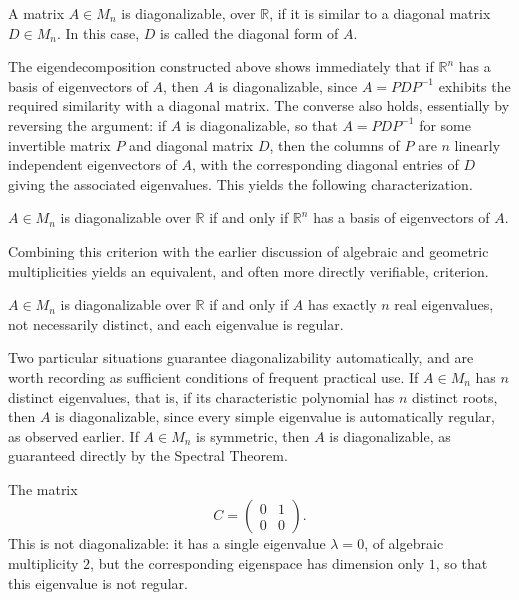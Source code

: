 \begin{definition}
A matrix $A \in M_n$ is diagonalizable, over $\mathbb{R}$, if it is similar to a diagonal matrix $D \in M_n$. In this case, $D$ is called the diagonal form of $A$.
\end{definition}

The eigendecomposition constructed above shows immediately that if $\mathbb{R}^n$ has a basis of eigenvectors of $A$, then $A$ is diagonalizable, since $A = PDP^{-1}$ exhibits the required similarity with a diagonal matrix. The converse also holds, essentially by reversing the argument: if $A$ is diagonalizable, so that $A = PDP^{-1}$ for some invertible matrix $P$ and diagonal matrix $D$, then the columns of $P$ are $n$ linearly independent eigenvectors of $A$, with the corresponding diagonal entries of $D$ giving the associated eigenvalues. This yields the following characterization.

\begin{theorem}
$A \in M_n$ is diagonalizable over $\mathbb{R}$ if and only if $\mathbb{R}^n$ has a basis of eigenvectors of $A$.
\end{theorem}

Combining this criterion with the earlier discussion of algebraic and geometric multiplicities yields an equivalent, and often more directly verifiable, criterion.

\begin{theorem}
$A \in M_n$ is diagonalizable over $\mathbb{R}$ if and only if $A$ has exactly $n$ real eigenvalues, not necessarily distinct, and each eigenvalue is regular.
\end{theorem}

Two particular situations guarantee diagonalizability automatically, and are worth recording as sufficient conditions of frequent practical use. If $A \in M_n$ has $n$ distinct eigenvalues, that is, if its characteristic polynomial has $n$ distinct roots, then $A$ is diagonalizable, since every simple eigenvalue is automatically regular, as observed earlier. If $A \in M_n$ is symmetric, then $A$ is diagonalizable, as guaranteed directly by the Spectral Theorem.

\begin{example}
The matrix
\[
C = \begin{pmatrix} 0 & 1 \\ 0 & 0
\end{pmatrix}.
\]
This is not diagonalizable: it has a single eigenvalue $\lambda = 0$, of algebraic multiplicity $2$, but the corresponding eigenspace has dimension only $1$, so that this eigenvalue is not regular.
\end{example}

